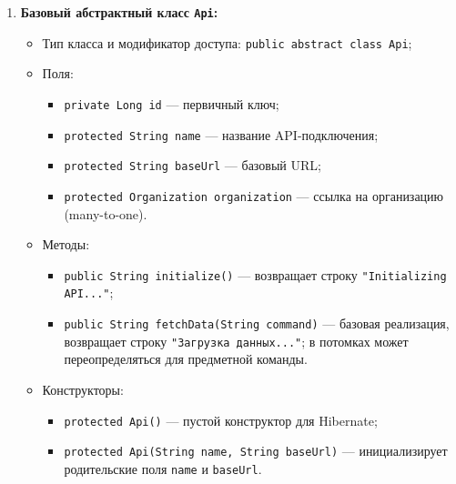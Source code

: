 \documentclass[11pt,a4paper]{article}
\begin{document}
\begin{enumerate}
    \item \textbf{Базовый абстрактный класс \texttt{Api}:}
    \begin{itemize}
        \item Тип класса и модификатор доступа: \texttt{public abstract class Api};
        \item Поля:
        \begin{itemize}
            \item \texttt{private Long id} --- первичный ключ;
            \item \texttt{protected String name} --- название API-подключения;
            \item \texttt{protected String baseUrl} --- базовый URL;
            \item \texttt{protected Organization organization} --- ссылка на организацию (many-to-one).
        \end{itemize}
        \item Методы:
        \begin{itemize}
            \item \texttt{public String initialize()} --- возвращает строку \texttt{"Initializing API..."};
            \item \texttt{public String fetchData(String command)} --- базовая реализация, возвращает строку \texttt{"Загрузка данных..."}; в потомках может переопределяться для предметной команды.
        \end{itemize}
        \item Конструкторы:
        \begin{itemize}
            \item \texttt{protected Api()} --- пустой конструктор для Hibernate;
            \item \texttt{protected Api(String name, String baseUrl)} --- инициализирует родительские поля \texttt{name} и \texttt{baseUrl}.
        \end{itemize}
    \end{itemize}


\end{enumerate}
\end{document}
